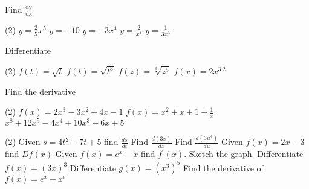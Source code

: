 \begin{Exercise}[title={Standard Derivatives},label=exStandardDerivatives]
	\Question Find $\frac{\text{dy}}{\text{dx}}$
	\begin{tasks}(2)
		\task $y =\frac{2}{5} x^{5}$ %
		\task $y = -10$ %
		\task $y = -3 x^{4}$ %
		\task $y =\frac{2}{x^{4}}$ %
		\task $y =\frac{1}{3 x^{3}}$ %
	\end{tasks}
	
	\Question Differentiate
	\begin{tasks}(2)
		\task $f (t) =\sqrt{t}$ %
		\task $f (t) =\sqrt{t^{3}}$ %
		\task $f (z) =\sqrt[{3}]{z^{5}}$ %
		\task $f (x) =2 x^{3.2}$ %
	\end{tasks}
	
	\Question Find the derivative
\begin{tasks}(2)
	\task $f (x) =2 x^{3} -3 x^{2} +4 x -1$ %
	\task $f (x) =x^{2} +x +1 +\frac{1}{x}$ %
	\task $x^{8} +12 x^{5} -4 x^{4} +10 x^{3} -6 x +5$%
\end{tasks}

\Question 
\begin{tasks}(2)
	\task Given $s =4 t^{2} -7 t +5$ find $\frac{d s}{d t}$ %
	\task Find $\frac{d \left (3 x\right )}{d x}$  %
	\task Find $\frac{d \left (3 u^{4}\right )}{d u}$ %
	\task Given $f (x) =2 x -3$ find $D f (x)$ %
	\task Given $f (x) =e^{x} -x$ find $f^{ \prime } (x)$. Sketch the graph. %
	\task Differentiate $f (x) =\left (3 x\right )^{3}$ %
	\task Differentiate $g (x) =\left (x^{3}\right )^{5}$ %
	\task Find the derivative of $f (x) =e^{x} -x^{e}$ %
\end{tasks}


\end{Exercise}
